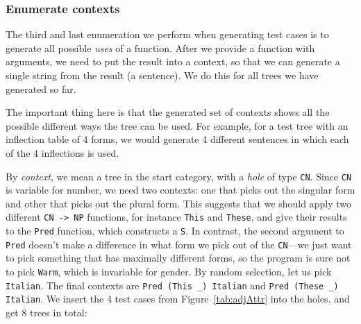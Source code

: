 \documentclass[runningheads]{llncs}
\def\t#1{\texttt{#1}}
\begin{document}
\subsubsection{Enumerate contexts} The third and last enumeration we perform when generating test cases is to generate all possible \emph{uses} of a function. After we provide a function with arguments, we need to put the result into a context, so that we can generate a single string from the result (a sentence). We do this for all trees we have generated so far.

The important thing here is that the generated set of contexts shows
all the possible different ways the tree can be used. For example, for
a test tree with an inflection table of 4 forms, we would generate 4 different sentences in which each of the 4 inflections is used.

By \emph{context}, we mean a tree in the start category, with a
\emph{hole} of type \t{CN}. Since \t{CN} is variable for
number, we need two contexts:
one that picks out the singular form and other that picks out
the plural form. This suggests that we should apply two different
\t{CN -> NP} functions, for instance \t{This} and \t{These}, and
give their results to the \t{Pred} function, which constructs a \t{S}.
In contrast, the second argument to \t{Pred} doesn't make a difference
in what form we pick out of the \t{CN}---we just want to pick
something that has maximally different forms, so the program is sure
not to pick \t{Warm}, which is invariable for gender. By random
selection, let us pick \t{Italian}.
The final contexts are \verb|Pred (This _) Italian| and \verb|Pred (These _) Italian|.
We insert the 4 test cases from Figure~\ref{tab:adjAttr} into the
holes, and get 8 trees in total: 
\end{document}
